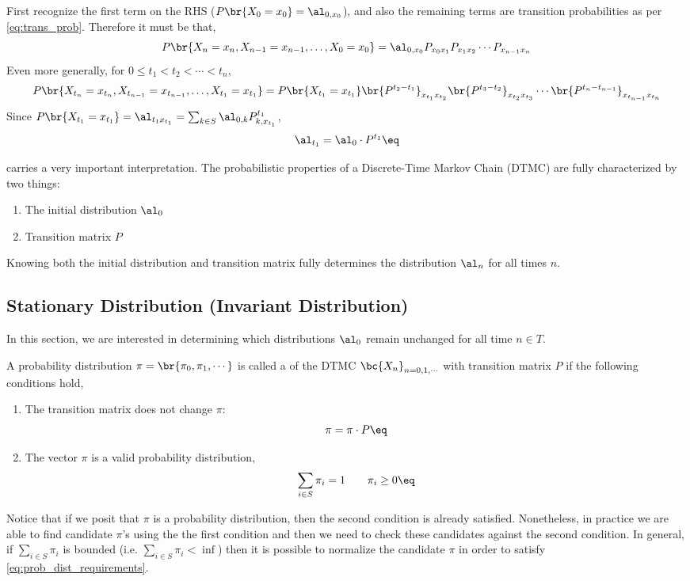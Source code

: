 \documentclass{article}
\newcommand{\val}[1]{X_{#1} = x_{#1}}
\begin{document}
First recognize the first term on the RHS ($P\br{X_{0} = x_{0}} = \al_{0, x_0}$), and also the remaining terms are transition probabilities as per \cref{eq:trans_prob}. Therefore it must be that,
\[ P\br{X_n=x_n, X_{n-1}=x_{n-1}, \ldots, X_{0}=x_{0}} = \al_{0, x_0} P_{x_0x_1}P_{x_1x_2}\cdots P_{x_{n-1}x_n} \]
Even more generally, for $0 \leq t_1 < t_2 < \cdots < t_n$,
\[ P\br{\val{t_n}, \val{t_{n-1}}, \ldots, \val{t_{1}}} = P\br{\val{t_1}} \br{P^{t_2 - t_1}}_{x_{t_1}x_{t_2}}\br{P^{t_3 - t_2}}_{x_{t_2}x_{t_3}}\cdots\br{P^{t_{n} - t_{n-1}}}_{x_{t_{n-1}}x_{t_{n}}}  \]
Since $P\br{\val{t_1}} = \al_{t_1 x_{t_1}} = \sum_{k \in S} \al_{0, k} P^{t_1}_{k, x_{t_1}}$,
\[ \al_{t_1} = \al_{0} \cdot P^{t_1} \eq \label{eq:distribution_fundamentals} \]
\begin{remark}
 carries a very important interpretation. The probabilistic properties of a Discrete-Time Markov Chain (DTMC) are fully characterized by two things:
\begin{enumerate}
    \item The initial distribution $\al_{0}$
    \item Transition matrix $P$
\end{enumerate}
Knowing both the initial distribution and transition matrix fully determines the distribution $\al_{n}$ for all times $n$.
\end{remark}

\subsection{Stationary Distribution (Invariant Distribution)}
In this section, we are interested in determining which distributions $\al_{0}$ remain unchanged for all time $n \in T$.
\begin{definition}
    A probability distribution $\pi = \br{\pi_0, \pi_1, \cdots}$ is called a  of the DTMC $\bc{X_n}_{n = 0,1, \cdots}$ with transition matrix $P$ if the following conditions hold,
    \begin{enumerate}
        \item The transition matrix does not change $\pi$:
        \[  \pi = \pi \cdot P \eq \label{eq:invariant}\]
        \item The vector $\pi$ is a valid probability distribution,
        \[ \sum_{i \in S} \pi_i = 1 \qquad \pi_i \geq 0 \eq \label{eq:prob_dist_requirements}\]
    \end{enumerate}
\end{definition}
Notice that if we posit that $\pi$ is a probability distribution, then the second condition is already satisfied. Nonetheless, in practice we are able to find candidate $\pi$'s using the the first condition and then we need to check these candidates against the second condition. In general, if $\sum_{i \in S} \pi_i$ is bounded (i.e. $\sum_{i \in S} \pi_i < \inf$) then it is possible to normalize the candidate $\pi$ in order to satisfy \cref{eq:prob_dist_requirements}. \\
\end{document}
